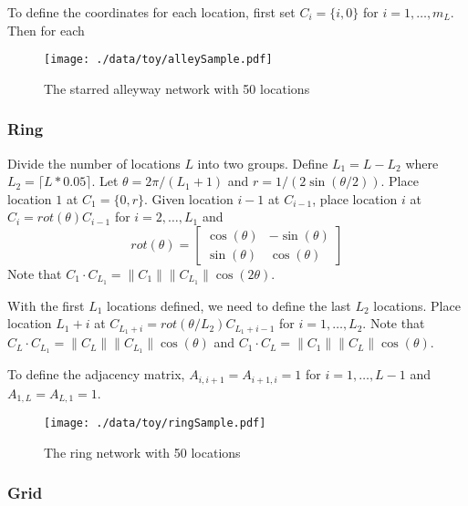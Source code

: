 \documentclass[11pt]{article}
\begin{document}
To define the coordinates for each location, first set $C_{i} =
\lbrace i,0 \rbrace$ for $i = 1,\ldots,m_L$.  Then for each 


\begin{figure}[htb]
\centering
\texttt{[image: ./data/toy/alleySample.pdf]}
\caption{\label{fig:alley50}The starred alleyway network with 50 locations}
\end{figure}



\subsubsection{Ring}
\label{sec-3-1-3}

Divide the number of locations $L$ into two groups.  Define $L_1 = L -
L_2$ where $L_2 = \lceil L*0.05 \rceil$.  Let $\theta = 2\pi/(L_1+1)$
and $r = 1/(2\sin(\theta/2))$.  Place location $1$ at $C_1 = \lbrace
0,r \rbrace$.  Given location $i-1$ at $C_{i-1}$, place location $i$
at $C_i = rot(\theta) C_{i-1}$ for $i = 2,\ldots,L_1$ and
\begin{equation*}
  rot(\theta) = \left[
    \begin{matrix}
      \cos(\theta) & -\sin(\theta)\\
      \sin(\theta) & \cos(\theta)
    \end{matrix}
  \right]
\end{equation*}
Note that $C_{1} \cdot C_{L_1} = \|C_{1}\| \|C_{L_1}\| \cos(2\theta)$.

With the first $L_1$ locations defined, we need to define the last
$L_2$ locations.  Place location $L_1 + i$ at $C_{L_1 + i} =
rot(\theta/L_2)C_{L_1 + i - 1}$ for $i = 1,\ldots,L_2$.  Note that
$C_{L} \cdot C_{L_1} = \|C_{L}\| \|C_{L_1}\| \cos(\theta)$ and $C_{1}
\cdot C_{L} = \|C_{1}\| \|C_{L}\| \cos(\theta)$.

To define the adjacency matrix, $A_{i,i+1} = A_{i+1,i} = 1$ for $i =
1,\ldots,L-1$ and $A_{1,L} = A_{L,1} = 1$.



\begin{figure}[htb]
\centering
\texttt{[image: ./data/toy/ringSample.pdf]}
\caption{\label{fig:ring50}The ring network with 50 locations}
\end{figure}




\subsubsection{Grid}
\label{sec-3-1-4}
\end{document}
